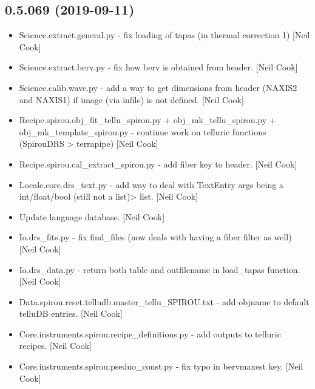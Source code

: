 \documentclass[a4paper,10pt,english]{report}
\begin{document}
\subsection{0.5.069 (2019-09-11)}
\label{\detokenize{misc/changelog:id72}}\begin{itemize}
\item {} 
Science.extract.general.py - fix loading of tapas (in thermal
correction 1) {[}Neil Cook{]}

\item {} 
Science.extract.berv.py - fix how berv is obtained from header. {[}Neil
Cook{]}

\item {} 
Science.calib.wave.py - add a way to get dimensions from header
(NAXIS2 and NAXIS1) if image (via infile) is not defined. {[}Neil Cook{]}

\item {} 
Recipe.spirou.obj\_fit\_tellu\_spirou.py + obj\_mk\_tellu\_spirou.py +
obj\_mk\_template\_spirou.py - continue work on telluric functions
(SpirouDRS \textendash{}\textgreater{} terrapipe) {[}Neil Cook{]}

\item {} 
Recipe.spirou.cal\_extract\_spirou.py - add fiber key to header. {[}Neil
Cook{]}

\item {} 
Locale.core.drs\_text.py - add way to deal with TextEntry args being a
int/float/bool (still not a list)\textendash{}\textgreater{} list. {[}Neil Cook{]}

\item {} 
Update language database. {[}Neil Cook{]}

\item {} 
Io.drs\_fits.py - fix find\_files (now deals with having a fiber filter
as well) {[}Neil Cook{]}

\item {} 
Io.drs\_data.py - return both table and outfilename in load\_tapas
function. {[}Neil Cook{]}

\item {} 
Data.spirou.reset.telludb.master\_tellu\_SPIROU.txt - add objname to
default telluDB entries. {[}Neil Cook{]}

\item {} 
Core.instruments.spirou.recipe\_definitions.py - add outputs to
telluric recipes. {[}Neil Cook{]}

\item {} 
Core.instruments.spirou.pseduo\_const.py - fix typo in bervmaxest key.
{[}Neil Cook{]}


\end{itemize}
\end{document}
